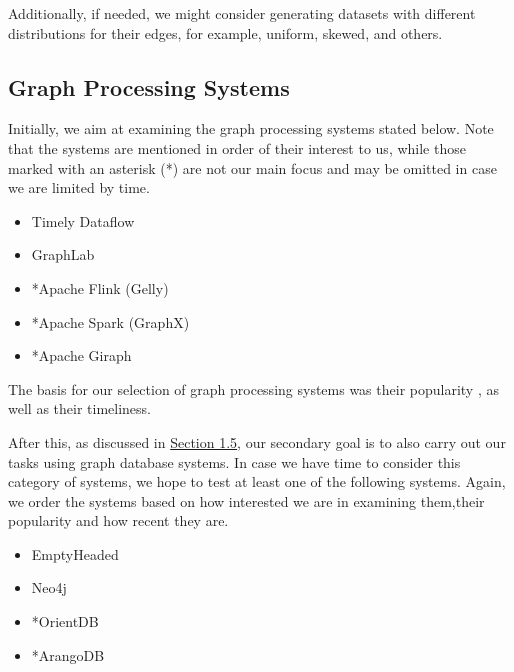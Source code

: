 \documentclass[a4paper,11pt]{article}
\begin{document}
\par Additionally, if needed, we might consider generating datasets with different distributions for their edges, for example, uniform, skewed, and others.

\subsection{Graph Processing Systems} \label{graph-proc}

\par Initially, we aim at examining the graph processing systems stated below. Note that the systems are mentioned in order of their interest to us, while those marked with an asterisk (*) are not our main focus and may be omitted in case we are limited by time.

\begin{itemize}

	\item Timely Dataflow \cite{naiad, timelydf}
	\item GraphLab \cite{graphlab}
	\item *Apache Flink (Gelly) \cite{flink}
	\item *Apache Spark (GraphX) \cite{spark,graphxpaper}
	\item *Apache Giraph \cite{giraph}

\end{itemize}

\par The basis for our selection of graph processing systems was their popularity \cite{survey}, as well as their timeliness.

\par After this, as discussed in \hyperref[feasibility]{Section 1.5}, our secondary goal is to also carry out our tasks using graph database systems. In case we have time to consider this category of systems, we hope to test at least one of the following systems. Again, we order the systems based on how interested we are in examining them,their popularity and how recent they are.

\begin{itemize}

	\item EmptyHeaded \cite{emptyheaded,emptyheadedgit}
	\item Neo4j \cite{neo4j}
	\item *OrientDB \cite{orientdb}
	\item *ArangoDB \cite{arangodb}

\end{itemize}
\end{document}
